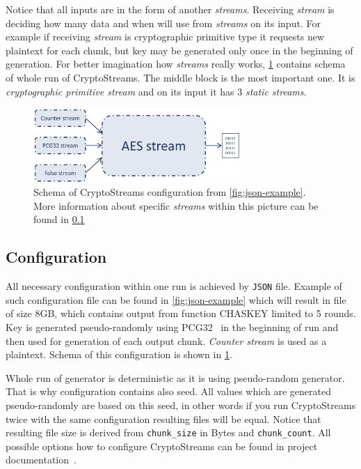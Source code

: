 \documentclass[
    digital,    %
    oneside,    %
    color,
    11pt,
    nocover,
    notable,
    nolof,
    nolot,
    final
]{fithesis3}
\begin{document}
Notice that all inputs are in the form of another \textit{streams}. Receiving \textit{stream} is deciding how many data and when will use from \textit{streams} on its input. For example if receiving \textit{stream} is cryptographic primitive type it requests new plaintext for each chunk, but key may be generated only once in the beginning of generation. For better imagination how \textit{streams} really works, \cref{fig:config-schema} contains schema of whole run of CryptoStreams. The middle block is the most important one. It is \textit{cryptographic primitive stream} and on its input it has 3 \textit{static streams}.

\begin{figure}[h]
	\centering
	\includegraphics[width=0.7\textwidth]{./images/pictures/config-schema.png}
	\caption{Schema of CryptoStreams configuration from \cref{fig:json-example}. More information about specific \textit{streams} within this picture can be found in \cref{subsec:configuration} }
	\label{fig:config-schema}
\end{figure}


\subsection{Configuration}
\label{subsec:configuration}

All necessary configuration within one run is achieved by \texttt{JSON} file. Example of such configuration file can be found in \cref{fig:json-example} which will result in file of size 8GB, which contains output from function CHASKEY limited to 5 rounds. Key is generated pseudo-randomly using PCG32~\cite{pcgGen} in the beginning of run and then used for generation of each output chunk. \textit{Counter stream} is used as a plaintext. Schema of this configuration is shown in \cref{fig:config-schema}. 

Whole run of generator is deterministic as it is using pseudo-random generator. That is why configuration contains also seed. All values which are generated pseudo-randomly are based on this seed, in other words if you run CryptoStreams twice with the same configuration resulting files will be equal. Notice that resulting file size is derived from \texttt{chunk\_size} in Bytes and \texttt{chunk\_count}. All possible options how to configure CryptoStreams can be found in project documentation~\cite{CryptoStreams-wiki}.
\end{document}
